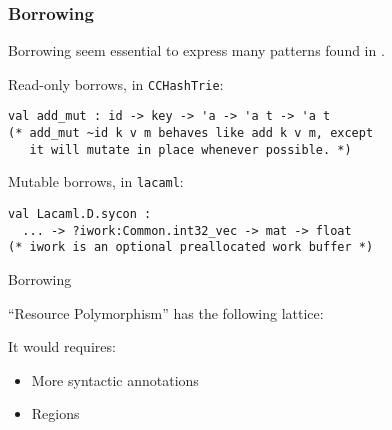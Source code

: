 \documentclass[xcolor=svgnames,11pt]{beamer}
\begin{document}
\begin{frame}
  \frametitle{Borrowing}

  Borrowing seem essential to express many patterns found in \ocaml.\pause

  Read-only borrows, in \texttt{CCHashTrie}:
\begin{lstlisting}
val add_mut : id -> key -> 'a -> 'a t -> 'a t
(* add_mut ~id k v m behaves like add k v m, except
   it will mutate in place whenever possible. *)
\end{lstlisting}
  \pause

  Mutable borrows, in \texttt{lacaml}:
\begin{lstlisting}
val Lacaml.D.sycon : 
  ... -> ?iwork:Common.int32_vec -> mat -> float
(* iwork is an optional preallocated work buffer *)
\end{lstlisting}
  
\end{frame}

\begin{frame}[fragile]{Borrowing}

  ``Resource Polymorphism'' has the following lattice:
  \begin{center}
\end{center}
  It would requires:
  \begin{itemize}
  \item More syntactic annotations
  \item Regions
  \end{itemize}
  
\end{frame}
\end{document}
